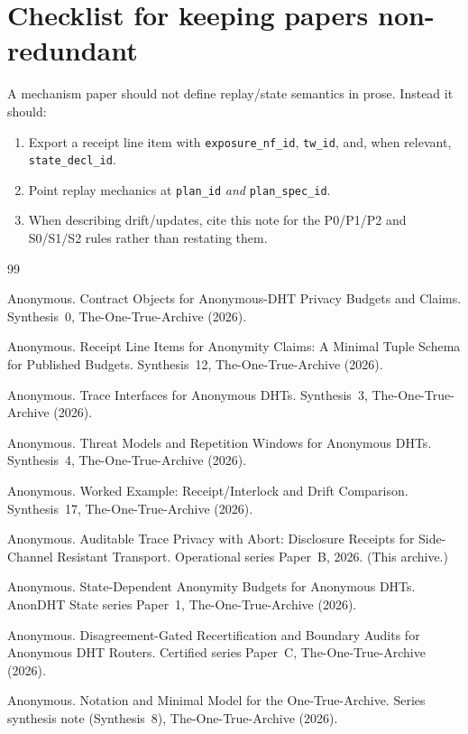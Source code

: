 \documentclass[11pt]{article}
\begin{document}
\section{Checklist for keeping papers non-redundant}
A mechanism paper should not define replay/state semantics in prose.
Instead it should:
\begin{enumerate}[leftmargin=*]
\item Export a receipt line item with \texttt{exposure\_nf\_id}, \texttt{tw\_id}, and, when relevant, \texttt{state\_decl\_id}.
\item Point replay mechanics at \texttt{plan\_id} \emph{and} \texttt{plan\_spec\_id}.
\item When describing drift/updates, cite this note for the P0/P1/P2 and S0/S1/S2 rules rather than restating them.
\end{enumerate}

\begin{thebibliography}{99}\small

Anonymous.
\newblock Contract Objects for Anonymous-DHT Privacy Budgets and Claims.
\newblock Synthesis~0, The-One-True-Archive (2026).

Anonymous.
\newblock Receipt Line Items for Anonymity Claims: A Minimal Tuple Schema for Published Budgets.
\newblock Synthesis~12, The-One-True-Archive (2026).

Anonymous.
\newblock Trace Interfaces for Anonymous DHTs.
\newblock Synthesis~3, The-One-True-Archive (2026).

Anonymous.
\newblock Threat Models and Repetition Windows for Anonymous DHTs.
\newblock Synthesis~4, The-One-True-Archive (2026).

Anonymous.
\newblock Worked Example: Receipt/Interlock and Drift Comparison.
\newblock Synthesis~17, The-One-True-Archive (2026).

Anonymous.
\newblock Auditable Trace Privacy with Abort: Disclosure Receipts for Side-Channel Resistant Transport.
\newblock Operational series Paper~B, 2026. (This archive.)

Anonymous.
\newblock State-Dependent Anonymity Budgets for Anonymous DHTs.
\newblock AnonDHT State series Paper~1, The-One-True-Archive (2026).

Anonymous.
\newblock Disagreement-Gated Recertification and Boundary Audits for Anonymous DHT Routers.
\newblock Certified series Paper~C, The-One-True-Archive (2026).

Anonymous.
\newblock Notation and Minimal Model for the One-True-Archive.
\newblock Series synthesis note (Synthesis~8), The-One-True-Archive (2026).

\end{thebibliography}
\end{document}
